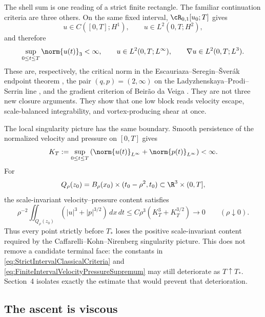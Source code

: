 The shell sum is one reading of a strict finite rectangle.  The familiar continuation
criteria are three others.  On the same fixed interval, \(\cR_{0,1}[u_0;T]\) gives
\[
  u\in C([0,T];H^1),
  \qquad
  u\in L^2(0,T;H^2),
\]
and therefore
\begin{equation}\label{eq:StrictIntervalClassicalCriteria}
  \sup_{0\leq t\leq T}\norm{u(t)}_3<\infty,
  \qquad
  u\in L^2(0,T;L^\infty),
  \qquad
  \nabla u\in L^2(0,T;L^3).
\end{equation}
These are, respectively, the critical norm in the
Escauriaza--Seregin--\v{S}ver\'ak endpoint theorem
\parencite{EscauriazaSereginSverak2003}, the pair \((q,p)=(2,\infty)\) on the
Ladyzhenskaya--Prodi--Serrin line
\parencite{Prodi1959,Serrin1962,Serrin1963,Ladyzhenskaya1967}, and the gradient
criterion of Beir\~ao da Veiga \parencite{BeiraoDaVeiga1995}.  They are not three new
closure arguments.  They show that one low block reads velocity escape,
scale-balanced integrability, and vortex-producing shear at once.

The local singularity picture has the same boundary.  Smooth persistence of the
normalized velocity and pressure on \([0,T]\) gives
\begin{equation}\label{eq:FiniteIntervalVelocityPressureSupremum}
  K_T
  :=\sup_{0\leq t\leq T}
  \left(
    \norm{u(t)}_{L^\infty}
    +\norm{p(t)}_{L^\infty}
  \right)
  <\infty.
\end{equation}
For
\[
  Q_\rho(z_0)
  =B_\rho(x_0)\times(t_0-\rho^2,t_0)
  \subset\R^3\times(0,T],
\]
the scale-invariant velocity--pressure content satisfies
\begin{equation}\label{eq:VanishingLocalScaleInvariantContent}
  \rho^{-2}
  \iint_{Q_\rho(z_0)}
  \left(|u|^3+|p|^{3/2}\right)\,dx\,dt
  \leq
  C\rho^3\left(K_T^3+K_T^{3/2}\right)
  \longrightarrow0
  \qquad(\rho\downarrow0).
\end{equation}
Thus every point strictly before \(T_*\) loses the positive scale-invariant content
required by the Caffarelli--Kohn--Nirenberg singularity picture.  This does not remove a
candidate terminal face: the constants in \eqref{eq:StrictIntervalClassicalCriteria}
and \eqref{eq:FiniteIntervalVelocityPressureSupremum} may still deteriorate as
\(T\uparrow T_*\).  Section~4 isolates exactly the estimate that would prevent that
deterioration.

\subsection{The ascent is viscous}\label{sub:WhyTheEulerTowerIsDifferent}

